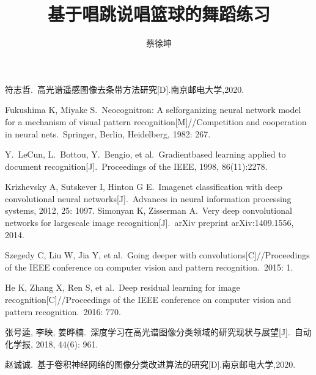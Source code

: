 \documentclass[UTF8,zihao=-4]{oucart}
\title{基于唱跳说唱篮球的舞蹈练习}
\author{蔡徐坤}
\begin{document}
    \makecover %
    \makesignature %
    \makeabstract %

    \thispagestyle{tableofcontents}
    \tableofcontents
    \newpage

    \setcounter{page}{1}


    
    

    \begin{thebibliography}{99}
        符志哲.\ 高光谱遥感图像去条带方法研究[D].南京邮电大学,2020.

        Fukushima K, Miyake S.\ Neocognitron: A self\-organizing neural network model for a mechanism of visual pattern recognition[M]//Competition and cooperation in neural nets.\ Springer, Berlin, Heidelberg, 1982: 267.

        Y.\ LeCun, L.\ Bottou, Y.\ Bengio, et al.\ Gradient\-based learning applied to document recognition[J].\ Proceedings of the IEEE, 1998, 86(11):2278.

        Krizhevsky A, Sutskever I, Hinton G E.\ Imagenet classification with deep convolutional neural networks[J].\ Advances in neural information processing systems, 2012, 25: 1097.
        Simonyan K, Zisserman A.\ Very deep convolutional networks for large\-scale image recognition[J].\ arXiv preprint arXiv:1409.1556, 2014.

        Szegedy C, Liu W, Jia Y, et al.\ Going deeper with convolutions[C]//Proceedings of the IEEE conference on computer vision and pattern recognition.\ 2015: 1.

        He K, Zhang X, Ren S, et al.\ Deep residual learning for image recognition[C]//Proceedings of the IEEE conference on computer vision and pattern recognition.\ 2016: 770.

        张号逵, 李映, 姜晔楠.\ 深度学习在高光谱图像分类领域的研究现状与展望[J].\ 自动化学报, 2018, 44(6): 961.

        赵诚诚.\ 基于卷积神经网络的图像分类改进算法的研究[D].南京邮电大学,2020.

    \end{thebibliography}
    \newpage
\end{document}
